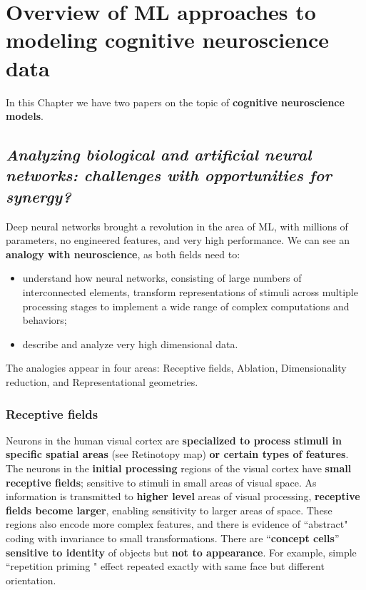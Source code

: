 \chapter{Overview of ML approaches to modeling cognitive neuroscience data}
\label{chap:overview}

In this Chapter we have two papers on the topic of \textbf{cognitive neuroscience models}.

\section[Analyzing biological and artificial neural networks]{\textit{Analyzing biological and artificial neural networks: challenges with opportunities for synergy?}\\ }

Deep neural networks brought a revolution in the area of ML, with millions of parameters, no engineered features, and very high performance. We can see an \textbf{analogy with neuroscience}, as both fields need to:
\begin{itemize}
    \item understand how neural networks, consisting of large numbers of interconnected elements, transform representations of stimuli across multiple processing stages to implement a wide range of complex computations and behaviors;
    \item describe and analyze very high dimensional data.
\end{itemize}

The analogies appear in four areas: Receptive fields, Ablation, Dimensionality reduction, and Representational geometries.

\subsection{Receptive fields}
Neurons in the human visual cortex are \textbf{specialized to process stimuli in specific spatial areas} (see \notedv Retinotopy map) \textbf{or certain types of features}.
The neurons in the \textbf{initial processing} regions of the visual cortex have \textbf{small receptive fields}; sensitive to stimuli in small areas of visual space.
As information is transmitted to \textbf{higher level} areas of visual processing, \textbf{receptive fields become larger}, enabling sensitivity to larger areas of space. These regions also encode more complex features, and there is evidence of ``abstract" coding with invariance to small transformations. There are ``\textbf{concept cells}” \textbf{sensitive to identity} of objects but \textbf{not to appearance}. For example, simple ``repetition priming \notet" effect repeated exactly with same face but different orientation.


